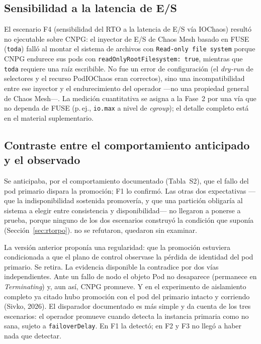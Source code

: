 \documentclass[12pt,twocolumn,letterpaper]{article}
\begin{document}
\subsection{Sensibilidad a la latencia de E/S}\label{sec:io}
El escenario F4 (sensibilidad del RTO a la latencia de E/S vía IOChaos) resultó no ejecutable sobre CNPG: el inyector de E/S de Chaos Mesh basado en FUSE (\texttt{toda}) falló al montar el sistema de archivos con \texttt{Read-only file system} porque CNPG endurece sus pods con \texttt{readOnlyRootFilesystem: true}, mientras que \texttt{toda} requiere una raíz escribible. No fue un error de configuración (el \textit{dry-run} de selectores y el recurso PodIOChaos eran correctos), sino una incompatibilidad entre ese inyector y el endurecimiento del operador —no una propiedad general de Chaos Mesh—. La medición cuantitativa se asigna a la Fase~2 por una vía que no dependa de FUSE (p.\,ej., \texttt{io.max} a nivel de \textit{cgroup}); el detalle completo está en el material suplementario.

\subsection{Contraste entre el comportamiento anticipado y el observado}\label{sec:contraste}
Se anticipaba, por el comportamiento documentado (Tabla~S2), que el fallo del pod primario dispara la promoción; F1 lo confirmó. Las otras dos expectativas —que la indisponibilidad sostenida promovería, y que una partición obligaría al sistema a elegir entre consistencia y disponibilidad— no llegaron a ponerse a prueba, porque ninguno de los dos escenarios construyó la condición que suponía (Sección~\ref{sec:rtorpo}). no se refutaron, quedaron sin examinar.

La versión anterior proponía una regularidad: que la promoción estuviera condicionada a que el plano de control observase la pérdida de identidad del pod primario. Se retira. La evidencia disponible la contradice por dos vías independientes. Ante un fallo de nodo el objeto Pod no desaparece  (permanece en \textit{Terminating}) y, aun así, CNPG promueve. Y en el experimento de aislamiento completo ya citado hubo promoción con el pod del primario intacto y corriendo (Sivko, 2026). El disparador documentado es más simple y da cuenta de los tres escenarios: el operador promueve cuando detecta la instancia primaria como no sana, sujeto a \texttt{failoverDelay}. En F1 la detectó; en F2 y F3 no llegó a haber nada que detectar.
\end{document}
